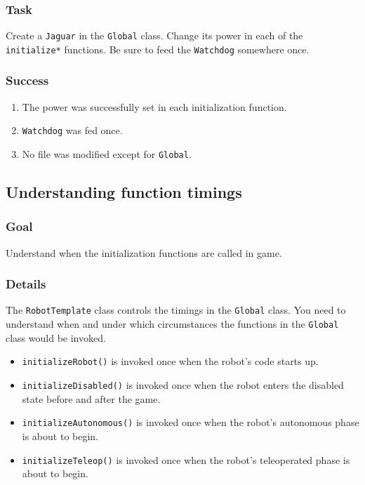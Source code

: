\documentclass[a4paper]{article}
\begin{document}
\subsubsection{Task} Create a \lstinline{Jaguar} in the \lstinline{Global} class. Change its power in each of the \lstinline{initialize*} functions. Be sure to feed the \lstinline{Watchdog} somewhere once.
\subsubsection{Success} \begin{enumerate}\item{The power was successfully set in each initialization function.}\item{\lstinline{Watchdog} was fed once.}\item{No file was modified except for \lstinline{Global}.}\end{enumerate}

\pagebreak\subsection{Understanding function timings}
\subsubsection{Goal} Understand when the initialization functions are called in game.
\subsubsection{Details} The \lstinline{RobotTemplate} class controls the timings in the \lstinline{Global} class. You need to understand when and under which circumstances the functions in the \lstinline{Global} class would be invoked. \begin{itemize}\item{\lstinline{initializeRobot()} is invoked once when the robot's code starts up.}\item{\lstinline{initializeDisabled()} is invoked once when the robot enters the disabled state before and after the game.}\item{\lstinline{initializeAutonomous()} is invoked once when the robot's autonomous phase is about to begin.}\item{\lstinline{initializeTeleop()} is invoked once when the robot's teleoperated phase is about to begin.}\end{itemize}
\end{document}
